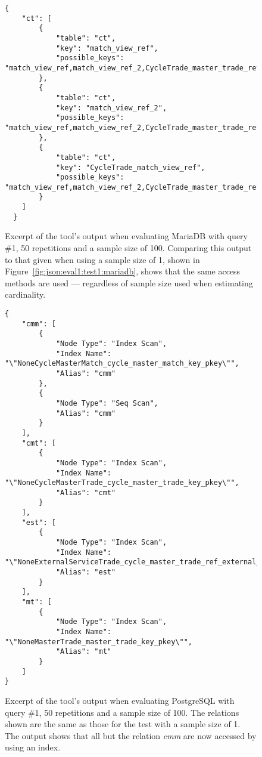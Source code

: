 \begin{figure}[ht]
  \begin{verbatim}
{
    "ct": [
        {
            "table": "ct",
            "key": "match_view_ref",
            "possible_keys": "match_view_ref,match_view_ref_2,CycleTrade_master_trade_ref,CycleTrade_trade_ref,CycleTrade_match_view_ref"
        },
        {
            "table": "ct",
            "key": "match_view_ref_2",
            "possible_keys": "match_view_ref,match_view_ref_2,CycleTrade_master_trade_ref,CycleTrade_trade_ref,CycleTrade_match_view_ref"
        },
        {
            "table": "ct",
            "key": "CycleTrade_match_view_ref",
            "possible_keys": "match_view_ref,match_view_ref_2,CycleTrade_master_trade_ref,CycleTrade_trade_ref,CycleTrade_match_view_ref"
        }
    ]
  }
\end{verbatim}
  \caption[Excerpt of the tool's output for MariaDB, query \#1, 50 repetitions and a
  sample size of 100.]{Excerpt of the tool's output when evaluating MariaDB
    with query \#1, 50 repetitions and a sample size of 100. Comparing this
    output to that given when using a sample size of 1, shown in
    Figure~\ref{fig:json:eval1:test1:mariadb}, shows that the same access
    methods are used --- regardless of sample size used when estimating
    cardinality.}\label{fig:json:eval1:test3:mariadb}
\end{figure}

\begin{figure}[ht]
  \begin{verbatim}
{
    "cmm": [
        {
            "Node Type": "Index Scan",
            "Index Name": "\"NoneCycleMasterMatch_cycle_master_match_key_pkey\"",
            "Alias": "cmm"
        },
        {
            "Node Type": "Seq Scan",
            "Alias": "cmm"
        }
    ],
    "cmt": [
        {
            "Node Type": "Index Scan",
            "Index Name": "\"NoneCycleMasterTrade_cycle_master_trade_key_pkey\"",
            "Alias": "cmt"
        }
    ],
    "est": [
        {
            "Node Type": "Index Scan",
            "Index Name": "\"NoneExternalServiceTrade_cycle_master_trade_ref_external_servic\"",
            "Alias": "est"
        }
    ],
    "mt": [
        {
            "Node Type": "Index Scan",
            "Index Name": "\"NoneMasterTrade_master_trade_key_pkey\"",
            "Alias": "mt"
        }
    ]
}
\end{verbatim}
  \caption[Excerpt of the tool's output for PostgreSQL, query \#1, 50 repetitions and a
  sample size of 100.]{Excerpt of the tool's output when evaluating PostgreSQL
    with query \#1, 50 repetitions and a sample size of 100. The relations shown are the
    same as those for the test with a sample size of 1. The output shows that
    all but the relation \textit{cmm} are now accessed by using an
    index.}\label{fig:json:eval1:test3:postgresql}
\end{figure}

